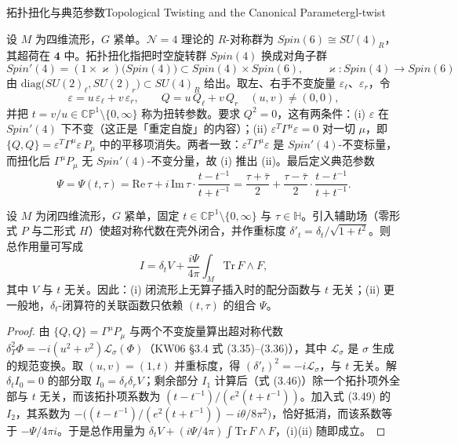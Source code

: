 \begin{centry}{拓扑扭化与典范参数}{Topological Twisting and the Canonical Parameter}{gl-twist}

\begin{definition}[扭化与扭化参数]
设 $M$ 为四维流形，$G$ 紧单。$\mathcal N=4$ 理论的 $R$-对称群为 $Spin(6)\cong SU(4)_{R}$，其超荷在 $\mathbf 4$ 中。拓扑扭化指把时空旋转群 $Spin(4)$ 换成对角子群
\[
Spin'(4)=(1\times\varkappa)\bigl(Spin(4)\bigr)\subset Spin(4)\times Spin(6),\qquad
\varkappa:Spin(4)\to Spin(6)
\]
由 $\mathrm{diag}\bigl(SU(2)_{\ell},SU(2)_{r}\bigr)\subset SU(4)_{R}$ 给出。取左、右手不变旋量 $\varepsilon_{\ell}$、$\varepsilon_{r}$，令
\[
\varepsilon=u\,\varepsilon_{\ell}+v\,\varepsilon_{r},\qquad Q=u\,Q_{\ell}+v\,Q_{r}\quad (u,v)\neq(0,0),
\]
并把 $t=v/u\in\mathbb{CP}^{1}\setminus\{0,\infty\}$ 称为扭转参数。要求 $Q^{2}=0$，这有两条件：(i) $\varepsilon$ 在 $Spin'(4)$ 下不变（这正是「重定自旋」的内容）；(ii) $\varepsilon^{T}\Gamma^{\mu}\varepsilon=0$ 对一切 $\mu$，即 $\{Q,Q\}=\varepsilon^{T}\Gamma^{\mu}\varepsilon\,P_{\mu}$ 中的平移项消失。两者一致：$\varepsilon^{T}\Gamma^{\mu}\varepsilon$ 是 $Spin'(4)$-不变标量，而扭化后 $\Gamma^{\mu}P_{\mu}$ 无 $Spin'(4)$-不变分量，故 (i) 推出 (ii)。最后定义典范参数
\[
\Psi=\Psi(t,\tau)=\mathrm{Re}\,\tau+i\,\mathrm{Im}\,\tau\cdot\frac{t-t^{-1}}{t+t^{-1}}
=\frac{\tau+\bar\tau}{2}+\frac{\tau-\bar\tau}{2}\cdot\frac{t-t^{-1}}{t+t^{-1}} .
\]
\end{definition}

\begin{theorem}\label{thm:psi}
设 $M$ 为闭四维流形，$G$ 紧单，固定 $t\in\mathbb{CP}^{1}\setminus\{0,\infty\}$ 与 $\tau\in\mathbb H$。引入辅助场（零形式 $P$ 与二形式 $H$）使超对称代数在壳外闭合，并作重标度 $\delta'_{t}=\delta_{t}/\sqrt{1+t^{2}}$。则总作用量可写成
\[
I=\delta_{t}V+\frac{i\Psi}{4\pi}\int_{M}\mathrm{Tr}\,F\wedge F ,
\]
其中 $V$ 与 $t$ 无关。因此：(i) 闭流形上无算子插入时的配分函数与 $t$ 无关；(ii) 更一般地，$\delta_{t}$-闭算符的关联函数只依赖 $(t,\tau)$ 的组合 $\Psi$。
\end{theorem}
\begin{proof}
由 $\{Q,Q\}=\Gamma^{\mu}P_{\mu}$ 与两个不变旋量算出超对称代数
$\delta_{T}^{2}\Phi=-i(u^{2}+v^{2})\mathcal L_{\sigma}(\Phi)$（KW06 §3.4 式 (3.35)--(3.36)），其中 $\mathcal L_{\sigma}$ 是 $\sigma$ 生成的规范变换。取 $(u,v)=(1,t)$ 并重标度，得 $(\delta'_{t})^{2}=-i\mathcal L_{\sigma}$，与 $t$ 无关。解 $\delta_{t}I_{0}=0$ 的部分取 $I_{0}=\delta_{\ell}\delta_{r}V$；剩余部分 $I_{1}$ 计算后（式 (3.46)）除一个拓扑项外全部与 $t$ 无关，而该拓扑项系数为 $(t-t^{-1})/(e^{2}(t+t^{-1}))$。加入式 (3.49) 的 $I_{2}$，其系数为 $-\bigl((t-t^{-1})/(e^{2}(t+t^{-1}))-i\theta/8\pi^{2}\bigr)$，恰好抵消，而该系数等于 $-\Psi/4\pi i$。于是总作用量为 $\delta_{t}V+(i\Psi/4\pi)\int\mathrm{Tr}\,F\wedge F$，(i)(ii) 随即成立。
\end{proof}



\end{centry}
